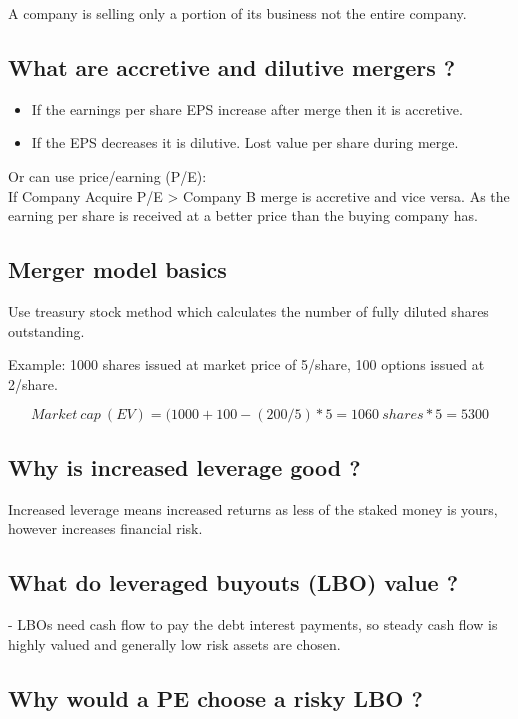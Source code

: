 \documentclass[11pt]{scrartcl} %
\begin{document}
A company is selling only a portion of its business not the entire company.

\subsection{What are accretive and dilutive mergers ?}

\begin{itemize}
	\item If the earnings per share EPS increase after merge then it is accretive.
	\item If the EPS decreases it is dilutive. Lost value per share during merge.
\end{itemize}

Or can use price/earning (P/E):\\

If Company Acquire P/E > Company B merge is accretive and vice versa. As the earning per share is received at a better price than the buying company has.

\subsection{Merger model basics}

Use treasury stock method which calculates the number of fully diluted shares outstanding.

Example: 1000 shares issued at market price of 5/share, 100 options issued at 2/share.

\[ Market\:cap\:(EV) = (1000 + 100 - (200/5)*5 = 1060\:shares *5 = 5300 \]

\subsection{Why is increased leverage good ?}

Increased leverage means increased returns as less of the staked money is yours, however increases financial risk.

\subsection{What do leveraged buyouts (LBO) value ?}

- LBOs need cash flow to pay the debt interest payments, so steady cash flow is highly valued and generally low risk assets are chosen. 

\subsection{Why would a PE choose a risky LBO ?}
\end{document}
